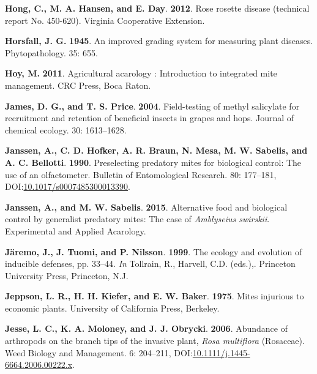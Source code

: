 \documentclass[12pt,final,CPage]{ufthesis}
\newlength{\cslhangindent}
\newenvironment{CSLReferences}[2] %
{%
	\setlength{\parindent}{0pt}
	\ifodd #1 \everypar{\setlength{\hangindent}{\cslhangindent}}\ignorespaces\fi
	\ifnum #2 > 0
	\setlength{\parskip}{#2\baselineskip}
	\fi
}%
{}
\begin{document}
{\begin{CSLReferences}{1}{0}
  \leavevmode{}%
  \textbf{Hong, C., M. A. Hansen, and E. Day}. \textbf{2012}. {Rose rosette disease} (technical report No. 450-620). Virginia Cooperative Extension.

  \leavevmode{}%
  \textbf{Horsfall, J. G.} \textbf{1945}. An improved grading system for measuring plant diseases. Phytopathology. 35: 655.

  \leavevmode{}%
  \textbf{Hoy, M.} \textbf{2011}. Agricultural acarology : Introduction to integrated mite management. CRC Press, Boca Raton.

  \leavevmode{}%
  \textbf{James, D. G., and T. S. Price}. \textbf{2004}. Field-testing of methyl salicylate for recruitment and retention of beneficial insects in grapes and hops. Journal of chemical ecology. 30: 1613--1628.

  \leavevmode{}%
  \textbf{Janssen, A., C. D. Hofker, A. R. Braun, N. Mesa, M. W. Sabelis, and A. C. Bellotti}. \textbf{1990}. Preselecting predatory mites for biological control: The use of an olfactometer. Bulletin of Entomological Research. 80: 177--181, DOI:\href{https://doi.org/10.1017/s0007485300013390}{10.1017/s0007485300013390}.

  \leavevmode{}%
  \textbf{Janssen, A., and M. W. Sabelis}. \textbf{2015}. Alternative food and biological control by generalist predatory mites: The case of {\emph{Amblyseius swirskii}}. Experimental and Applied Acarology.

  \leavevmode{}%
  \textbf{Järemo, J., J. Tuomi, and P. Nilsson}. \textbf{1999}. The ecology and evolution of inducible defenses, pp. 33--44. \emph{In} Tollrain, R., Harvell, C.D. (eds.),. Princeton University Press, Princeton, N.J.

  \leavevmode{}%
  \textbf{Jeppson, L. R., H. H. Kiefer, and E. W. Baker}. \textbf{1975}. Mites injurious to economic plants. University of California Press, Berkeley.

  \leavevmode{}%
  \textbf{Jesse, L. C., K. A. Moloney, and J. J. Obrycki}. \textbf{2006}. Abundance of arthropods on the branch tips of the invasive plant, {\emph{Rosa multiflora}} ({Rosaceae}). Weed Biology and Management. 6: 204--211, DOI:\href{https://doi.org/10.1111/j.1445-6664.2006.00222.x}{10.1111/j.1445-6664.2006.00222.x}.


\end{CSLReferences}}
\end{document}
